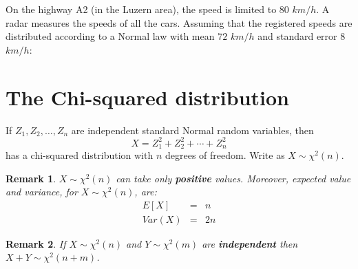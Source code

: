 \documentclass[smaller]{beamer}\usepackage[]{graphicx}\usepackage[]{color}
\newtheorem{remark}{Remark}[section]
\begin{document}
\begin{frame}{\secname}

\begin{example}
\begin{footnotesize}
  On the highway A2 (in the Luzern area), the speed is limited to $80$ $km/h$. A radar measures the speeds of all the cars.
  Assuming that the registered speeds are distributed according to a Normal law with mean $72$ $km/h$ and standard error $8$ $km/h$: \bigskip

\end{footnotesize}
\end{example}
\end{frame}





\section{The Chi-squared distribution}

\begin{frame}{\secname}
  \begin{definition}
  If $Z_{1},Z_{2},\ldots ,Z_{n}$ are independent standard Normal random
  variables, then%
  \begin{equation*}
  X=Z_{1}^{2}+Z_{2}^{2}+\cdots +Z_{n}^{2}
  \end{equation*}%
  has a chi-squared distribution with $n$ degrees of freedom. Write as $X\sim \chi ^{2}(n)$.
  \end{definition}
\pause
\begin{remark}
  $X\sim \chi ^{2}(n)$ can take only \textbf{positive }values. Moreover, expected value and variance, for $X\sim \chi ^{2}(n)$, are:
  \begin{eqnarray*}
  E\left[ X\right] &=&n \\
  Var\left( X\right) &=&2n
  \end{eqnarray*}
\end{remark}
\begin{remark}
  If $X\sim \chi ^{2}(n)$ and $Y\sim \chi ^{2}(m)$ are \textbf{independent} then $X+Y\sim \chi ^{2}(n+m)$.
\end{remark}
\end{frame}
\end{document}
